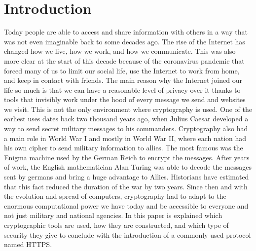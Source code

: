 \chapter{Introduction}\label{chap:introduction}
Today people are able to access and share information with others in a way that was not even imaginable back to some decades ago. The rise of the Internet has changed how we live, how we work, and how we communicate. This was also more clear at the start of this decade because of the coronavirus pandemic that forced many of us to limit our social life, use the Internet to work from home, and keep in contact with friends. The main reason why the Internet joined our life so much is that we can have a reasonable level of privacy over it thanks to tools that invisibly work under the hood of every message we send and websites we visit. This is not the only environment where cryptography is used. One of the earliest uses dates back two thousand years ago, when Julius Caesar developed a way to send secret military messages to his commanders. Cryptography also had a main role in World War I and mostly in World War II, where each nation had his own cipher to send military information to allies. The most famous was the Enigma machine used by the German Reich to encrypt the messages. After years of work, the English mathematician Alan Turing was able to decode the messages sent by germans and bring a huge advantage to Allies. Historians have estimated that this fact reduced the duration of the war by two years. Since then and with the evolution and spread of computers, cryptography had to adapt to the enormous computational power we have today and be accessible to everyone and not just military and national agencies. In this paper is explained which cryptographic tools are used, how they are constructed, and which type of security they give to conclude with the introduction of a commonly used protocol named HTTPS.

